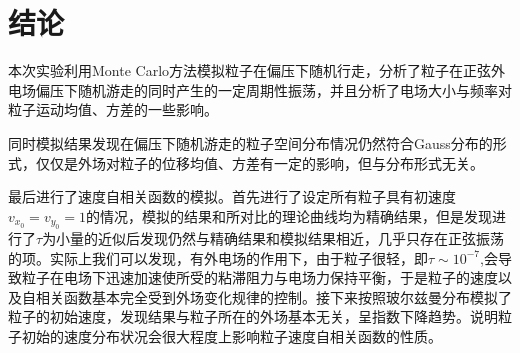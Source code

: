 \documentclass{article}
\begin{document}
	\section{结论}
	本次实验利用Monte Carlo方法模拟粒子在偏压下随机行走，分析了粒子在正弦外电场偏压下随机游走的同时产生的一定周期性振荡，并且分析了电场大小与频率对粒子运动均值、方差的一些影响。
	
	
	同时模拟结果发现在偏压下随机游走的粒子空间分布情况仍然符合Gauss分布的形式，仅仅是外场对粒子的位移均值、方差有一定的影响，但与分布形式无关。
	
	
	最后进行了速度自相关函数的模拟。首先进行了设定所有粒子具有初速度$ v_{x_0}=v_{y_0}=1 $的情况，模拟的结果和所对比的理论曲线均为精确结果，但是发现进行了$ \tau $为小量的近似后发现仍然与精确结果和模拟结果相近，几乎只存在正弦振荡的项。实际上我们可以发现，有外电场的作用下，由于粒子很轻，即$ \tau\sim10^{-7} $,会导致粒子在电场下迅速加速使所受的粘滞阻力与电场力保持平衡，于是粒子的速度以及自相关函数基本完全受到外场变化规律的控制。接下来按照玻尔兹曼分布模拟了粒子的初始速度，发现结果与粒子所在的外场基本无关，呈指数下降趋势。说明粒子初始的速度分布状况会很大程度上影响粒子速度自相关函数的性质。
\end{document}
